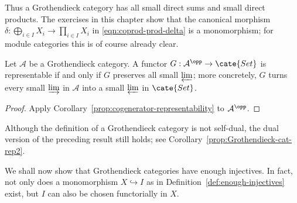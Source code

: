 Thus a Grothendieck category has all small direct sums and small direct
products. The exercises in this chapter show that the canonical morphism
$\delta:\bigoplus_{i\in I}X_i\to\prod_{i\in I}X_i$ in
\eqref{eqn:coprod-prod-delta} is a monomorphism; for module categories this is
of course already clear.

\begin{corollary}\label{prop:Grothendieck-cat-rep1}
Let $\mathcal{A}$ be a Grothendieck category. A functor
$G:\mathcal{A}^{\opp}\to\cate{Set}$ is representable if and only if $G$
preserves all small $\varprojlim$; more concretely, $G$ turns every small
$\varinjlim$ in $\mathcal{A}$ into a small $\varprojlim$ in $\cate{Set}$.
\end{corollary}
\begin{proof}
Apply Corollary~\ref{prop:cogenerator-representability} to
$\mathcal{A}^{\opp}$.
\end{proof}

Although the definition of a Grothendieck category is not self-dual, the dual
version of the preceding result still holds; see
Corollary~\ref{prop:Grothendieck-cat-rep2}.

We shall now show that Grothendieck categories have enough injectives. In fact,
not only does a monomorphism $X\hookrightarrow I$ as in
Definition~\ref{def:enough-injectives} exist, but $I$ can also be chosen
functorially in $X$.

